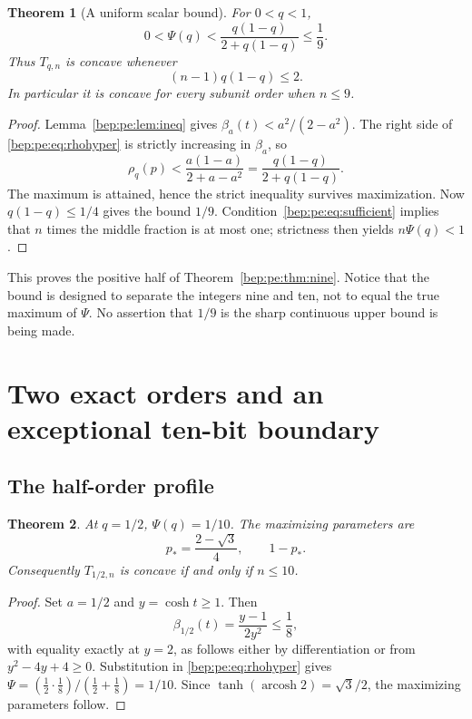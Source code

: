 \documentclass[11pt]{article}
\numberwithin{equation}{section}
\newtheorem{theorem}{Theorem}[section]
\theoremstyle{definition}
\theoremstyle{remark}
\newcommand{\arcosh}{\operatorname{arcosh}}
\begin{document}
\begin{theorem}[A uniform scalar bound]\label{bep:pe:thm:bound}
For $0<q<1$,
\begin{equation}
 0<\Psi(q)<\frac{q(1-q)}{2+q(1-q)}\leq\frac19.\label{bep:pe:eq:profilebound}
\end{equation}
Thus $T_{q,n}$ is concave whenever
\begin{equation}
 (n-1)q(1-q)\leq2.\label{bep:pe:eq:sufficient}
\end{equation}
In particular it is concave for every subunit order when $n\leq9$.
\end{theorem}
\begin{proof}
Lemma~\ref{bep:pe:lem:ineq} gives
$\beta_a(t)<a^2/(2-a^2)$. The right side of
\eqref{bep:pe:eq:rhohyper} is strictly increasing in $\beta_a$, so
\[
 \rho_q(p)<\frac{a(1-a)}{2+a-a^2}
 =\frac{q(1-q)}{2+q(1-q)}.
\]
The maximum is attained, hence the strict inequality survives
maximization. Now $q(1-q)\leq1/4$ gives the bound $1/9$.
Condition~\eqref{bep:pe:eq:sufficient} implies that $n$ times the middle
fraction is at most one; strictness then yields $n\Psi(q)<1$.
\end{proof}

This proves the positive half of Theorem~\ref{bep:pe:thm:nine}. Notice that the
bound is designed to separate the integers nine and ten, not to equal
the true maximum of $\Psi$. No assertion that $1/9$ is the sharp
continuous upper bound is being made.

\section{Two exact orders and an exceptional ten-bit boundary}\label{bep:pe:sec:exactorders}
\subsection{The half-order profile}
\begin{theorem}\label{bep:pe:thm:half}
At $q=1/2$, $\Psi(q)=1/10$. The maximizing parameters are
\begin{equation}
 p_* =\frac{2-\sqrt3}{4},\qquad1-p_*.
\end{equation}
Consequently $T_{1/2,n}$ is concave if and only if $n\leq10$.
\end{theorem}
\begin{proof}
Set $a=1/2$ and $y=\cosh t\geq1$. Then
\[
 \beta_{1/2}(t)=\frac{y-1}{2y^2}\leq\frac18,
\]
with equality exactly at $y=2$, as follows either by differentiation or
from $y^2-4y+4\geq0$. Substitution in
\eqref{bep:pe:eq:rhohyper} gives
$\Psi=(\tfrac12\cdot\tfrac18)/(\tfrac12+\tfrac18)=1/10$.
Since $\tanh(\arcosh2)=\sqrt3/2$, the maximizing parameters follow.
\end{proof}
\end{document}
